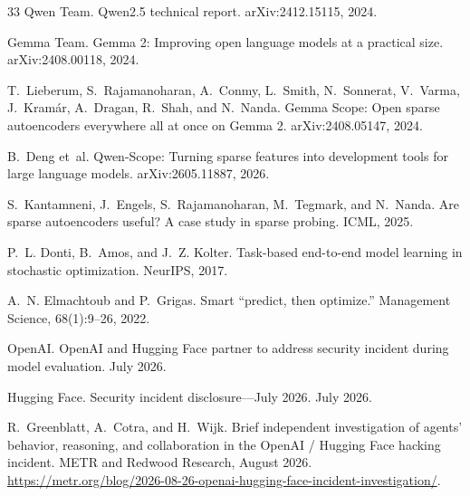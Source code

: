 \begin{thebibliography}{33}
Qwen Team.
\newblock Qwen2.5 technical report.
\newblock arXiv:2412.15115, 2024.

Gemma Team.
\newblock Gemma 2: Improving open language models at a practical size.
\newblock arXiv:2408.00118, 2024.

T.~Lieberum, S.~Rajamanoharan, A.~Conmy, L.~Smith, N.~Sonnerat, V.~Varma,
J.~Kram{\'a}r, A.~Dragan, R.~Shah, and N.~Nanda.
\newblock Gemma Scope: Open sparse autoencoders everywhere all at once on
Gemma 2.
\newblock arXiv:2408.05147, 2024.

B.~Deng et~al.
\newblock Qwen-Scope: Turning sparse features into development tools for large
  language models.
\newblock arXiv:2605.11887, 2026.

S.~Kantamneni, J.~Engels, S.~Rajamanoharan, M.~Tegmark, and N.~Nanda.
\newblock Are sparse autoencoders useful? A case study in sparse probing.
\newblock ICML, 2025.

P.~L. Donti, B.~Amos, and J.~Z. Kolter.
\newblock Task-based end-to-end model learning in stochastic optimization.
\newblock NeurIPS, 2017.

A.~N. Elmachtoub and P.~Grigas.
\newblock Smart ``predict, then optimize.''
\newblock Management Science, 68(1):9--26, 2022.

OpenAI.
\newblock OpenAI and Hugging Face partner to address security incident during
  model evaluation.
\newblock July 2026.

Hugging Face.
\newblock Security incident disclosure---July 2026.
\newblock July 2026.

R.~Greenblatt, A.~Cotra, and H.~Wijk.
\newblock Brief independent investigation of agents' behavior, reasoning, and
  collaboration in the OpenAI / Hugging Face hacking incident.
\newblock METR and Redwood Research, August 2026.
\newblock
\url{https://metr.org/blog/2026-08-26-openai-hugging-face-incident-investigation/}.

\end{thebibliography}
